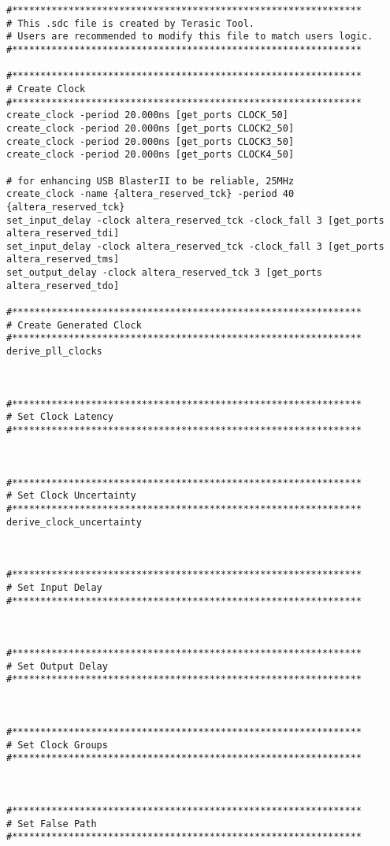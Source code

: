 \documentclass[dvipdfm]{book}
\begin{document}
\begin{verbatim}
#**************************************************************
# This .sdc file is created by Terasic Tool.
# Users are recommended to modify this file to match users logic.
#**************************************************************

#**************************************************************
# Create Clock
#**************************************************************
create_clock -period 20.000ns [get_ports CLOCK_50]
create_clock -period 20.000ns [get_ports CLOCK2_50]
create_clock -period 20.000ns [get_ports CLOCK3_50]
create_clock -period 20.000ns [get_ports CLOCK4_50]

# for enhancing USB BlasterII to be reliable, 25MHz
create_clock -name {altera_reserved_tck} -period 40 {altera_reserved_tck}
set_input_delay -clock altera_reserved_tck -clock_fall 3 [get_ports altera_reserved_tdi]
set_input_delay -clock altera_reserved_tck -clock_fall 3 [get_ports altera_reserved_tms]
set_output_delay -clock altera_reserved_tck 3 [get_ports altera_reserved_tdo]

#**************************************************************
# Create Generated Clock
#**************************************************************
derive_pll_clocks



#**************************************************************
# Set Clock Latency
#**************************************************************



#**************************************************************
# Set Clock Uncertainty
#**************************************************************
derive_clock_uncertainty



#**************************************************************
# Set Input Delay
#**************************************************************



#**************************************************************
# Set Output Delay
#**************************************************************



#**************************************************************
# Set Clock Groups
#**************************************************************



#**************************************************************
# Set False Path
#**************************************************************




\end{verbatim}
\end{document}
